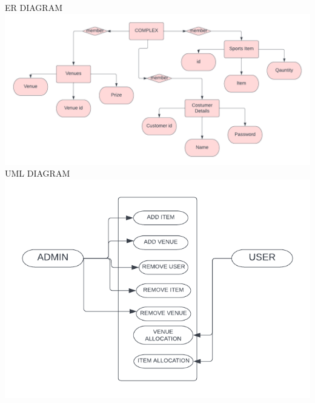\documentclass[a4paper,12pt]{report}
\begin{document}
\big ER DIAGRAM
\\
\includegraphics[scale=.5]{ER.png}
\newline
\big UML DIAGRAM
\\
\includegraphics[scale=1]{UML.png}
\newline
\end{document}
